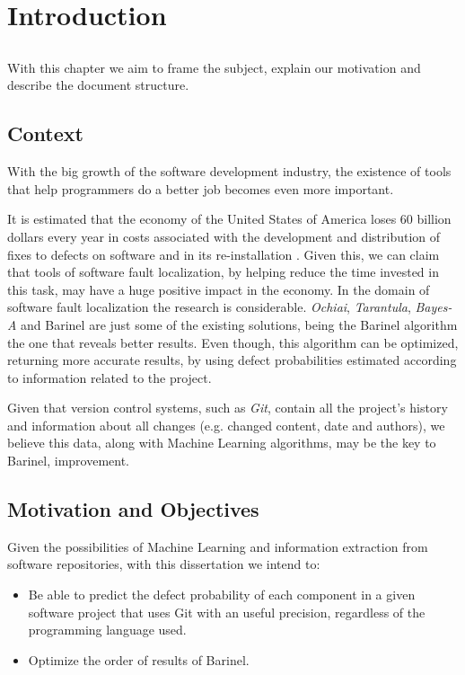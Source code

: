 \chapter{Introduction} \label{chap:intro}

\section*{}

With this chapter we aim to frame the subject, explain our motivation and describe the document structure.

\section{Context} \label{sec:context}

With the big growth of the software development industry, the existence of tools that help programmers do a better job becomes even more important.

It is estimated that the economy of the United States of America loses 60 billion dollars every year in costs associated with the development and distribution of fixes to defects on software and in its re-installation \cite{Zhivich2009}. Given this, we can claim that tools of software fault localization, by helping reduce the time invested in this task, may have a huge positive impact in the economy. In the domain of software fault localization the research is considerable. \emph{Ochiai}, \emph{Tarantula}, \emph{Bayes-A} and Barinel are just some of the existing solutions, being the Barinel algorithm the one that reveals better results.
Even though, this algorithm can be optimized, returning more accurate results, by using defect probabilities estimated according to information related to the project.

Given that version control systems, such as \emph{Git}, contain all the project's history and information about all changes (e.g. changed content, date and authors), we believe this data, along with Machine Learning algorithms, may be the key to Barinel, improvement.

\section{Motivation and Objectives} \label{sec:goals}

Given the possibilities of Machine Learning and information extraction from software repositories, with this dissertation we intend to:
%
\begin{itemize}
\item Be able to predict the defect probability of each component in a given software project that uses Git with an useful precision, regardless of the programming language used.
\item Optimize the order of results of Barinel.
\end{itemize}

